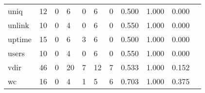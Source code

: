 \begin{longtable}{lp{1.2cm}p{1.2cm}p{1.2cm}p{1.2cm}p{1.2cm}p{1.2cm}p{1.2cm}p{1.2cm}p{1.2cm}p{1.2cm}}
uniq      &                                    12 &                                                  0 &                                                  6 &                                                  0 &                                                  6 &                                                  0 &                                         0.500 &                                              1.000 &                                              0.000 \\
unlink    &                                    10 &                                                  0 &                                                  4 &                                                  0 &                                                  6 &                                                  0 &                                         0.550 &                                              1.000 &                                              0.000 \\
uptime    &                                    15 &                                                  0 &                                                  6 &                                                  3 &                                                  6 &                                                  0 &                                         0.500 &                                              1.000 &                                              0.000 \\
users     &                                    10 &                                                  0 &                                                  4 &                                                  0 &                                                  6 &                                                  0 &                                         0.550 &                                              1.000 &                                              0.000 \\
vdir      &                                    46 &                                                  0 &                                                 20 &                                                  7 &                                                 12 &                                                  7 &                                         0.533 &                                              1.000 &                                              0.152 \\
wc        &                                    16 &                                                  0 &                                                  4 &                                                  1 &                                                  5 &                                                  6 &                                         0.703 &                                              1.000 &                                              0.375 \\

\end{longtable}
